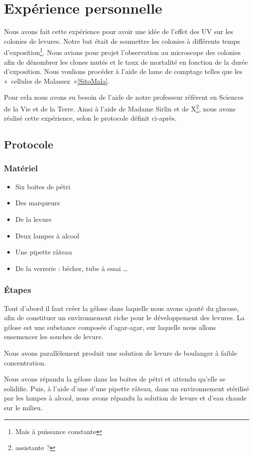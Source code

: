 \section{Expérience personnelle}
Nous avons fait cette expérience pour avoir une idée de l'effet des UV sur les colonies de levures. 
Notre but était de soumettre les colonies à différents temps d'exposition\footnote{Mais à puissance constante}. 
Nous avions pour projet l'observation au microscope des colonies afin de dénombrer les clones mutés et le 
taux de mortalité en fonction de la durée d'exposition.
Nous voulions procéder à l'aide de lame de comptage telles que les «~cellules de Malassez~»\ref{SitoMala}.

Pour cela nous avons eu besoin de l'aide de notre professeur référent en Sciences de la Vie et de la Terre.
Ainsi à l'aide de Madame Sirlin et de X\footnote{assistante ?}, nous avons réalisé cette expérience, selon le protocole définit ci-après.

\subsection{Protocole}
  \subsubsection{Matériel}
    \begin{itemize}
      \item Six boites de pétri
      \item Des marqueurs
      \item De la levure
      \item Deux lampes à alcool
      \item Une pipette râteau
      \item De la verrerie : bécher, tube à essai …
    \end{itemize}
  \subsubsection{Étapes}
    Tout d'abord il faut créer la gélose dans laquelle nous avons ajouté du glucose, afin de constituer un environnement riche pour le développement des levures. La gélose est une substance composée d'agar-agar, sur laquelle nous allons ensemencer les souches de levure.
    
    Nous avons parallèlement produit une solution de levure de boulanger à faible concentration. 
    
    Nous avons répandu la gélose dans les boites de pétri et attendu qu'elle se solidifie. Puis, à l'aide d'une d'une pipette râteau, dans un environnement stérilisé par les lampes à alcool, nous avons répandu la solution de levure et d'eau chaude sur le milieu. 
    
